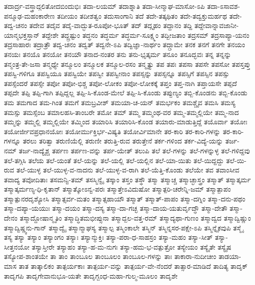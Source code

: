 {ತದಾರ್ದ್ರ-ವಸ್ತ್ರಾದ್ಗಲಿತೋದಬಿಂದುಭಿಃ
ತದಾ-ಲಯಮ್
ತದಾಶ್ನಾತಿ
ತದಾ-ಸೀನ್ಮಾಘ-ಮಾಸೋ-ಽಪಿ
ತದಾ-ಽಸಾವಶ-ಪನ್ಮೂಢ-ಮಹಂಕಾರೇಣ
ತದೀಯಂ
ತದೀಶತ್ವಂ
ತದುಸಾಂಗಾನಿ
ತದೆ
ತದೇ-ತತ್ಕಥಿತಂ
ತದೇ-ತದ್ವಕ್ತುಮರ್ಹಥ
ತದೇ-ತದ್ವ-ಚನಂ
ತದೇವ
ತದೈವ
ತದೈ-ವಾದ್ಭುತ-ರೂಪೋ-ಭೂತ್
ತದ್
ತದ್ಗೃಹಂ
ತದ್ದಾನಂ
ತದ್ದಿ
ತದ್ದೇವಾನ್ನಾವಜಾನೀ-ಯಾನ್ಮಭಕ್ತಸ್ತಾನ್
ತದ್ದೇಶೇ
ತದ್ದ್ರಷ್ಟುಂ
ತದ್ಧನಂ
ತದ್ಧರ್ಮ
ತದ್ಧರ್ಮ-ಸೂಕ್ಷ್ಮಂ
ತದ್ಬೀಜತಾಂ
ತದ್ರಸಮ್
ತದ್ರಸಾಪ್ಯಾ-ಯನಂ
ತದ್ರಸಾಹಾರಃ
ತದ್ರಾತ್ರೌ
ತದ್ವ-ಚನಂ
ತದ್ವತ್
ತದ್ವನೇ-ಽಪಿ
ತದ್ವಿಜ್ಞಾ-ನಾರ್ಥಂ
ತದ್ಗ್ರಾಮೇ
ತನಕ
ತನಗೆ
ತನಗೇ
ತನಯಂ
ತನಯಃ
ತನಯೊ
ತನಯೋ
ತನಯೌ
ತನಾದ-ನಂತರ
ತನು
ತನು-ಭೃತ್ಕರ್ಮ
ತನೂಂ
ತನೂದ್ಭವಃ
ತನ್ನ
ತನ್ನನ್ನು
ತನ್ಮಂತ್ರ-ತೇ-ಜಸಾ
ತನ್ಮಧ್ಯೇ
ತನ್ಮೂಲಂ
ತನ್ಮೂಲಕ
ತನ್ಮೂಲ-ರಸಂ
ತನ್ಮೃತ್ಯು
ತಪ
ತಪಃ
ತಪಸಾ
ತಪಸೇ
ತಪಸೋ
ತಪಸ್ತಪ್ತು
ತಪಸ್ವಿ-ಗಳಿಗೂ
ತಪಸ್ವಿಯೂ
ತಪಸ್ವಿಯೇ
ತಪಸ್ವೀ
ತಪಸ್ವೀನಾಂ
ತಪಸ್ಸನ್ನು
ತಪಸ್ಸನ್ನೂ
ತಪಸ್ಸಿಗೆ
ತಪಸ್ಸಿನ
ತಪಸ್ಸು
ತಪಸ್ಸೆಂದರೆ
ತಪಸ್ಸೇ
ತಪೋ
ತಪೋ-ಭಿಶ್ಚ
ತಪೋ-ಲೋಕಂ
ತಪೋ-ಲೋಕಕ್ಕೆ
ತಪ್ತಂ
ತಪ್ತ-ನಾಗಿ
ತಪ್ತಾಯಸೇ
ತಪ್ಪದೆ
ತಪ್ಪದೇ
ತಪ್ಪಿ
ತಪ್ಪಿ-ಗಾಗಿ
ತಪ್ಪಿದ್ದಲ್ಲ
ತಪ್ಪಿ-ಸಿ-ಕೊಂಡ-ಮೇಲೆ
ತಪ್ಪಿ-ಸಿ-ಕೊಂಡು
ತಪ್ಪುಣ್ಯಂ
ತಬ್ಬಿ-ಕೊಂಡನು
ತಬ್ಬಿ-ಕೊಂಡು
ತಮ
ತಮಗಾದ
ತಮ-ಗಿಂತ
ತಮಗೆ
ತಮಬ್ರವೀಶ್
ತಮಯಾ-ಚ-ಯನ್
ತಮರ್ಭಕಂ
ತಮಶ್ಚೈವ
ತಮಸಿ
ತಮಸ್ಯ
ತಮಸ್ಸು
ತಮಸ್ಸೆಂಬ
ತಮಾಲಹಸಿ-ತಾಂಬರೇ
ತಮೋ
ತಮ್
ತಮ್ಮ
ತಮ್ಮಂಥ-ವರ
ತಮ್ಮ-ತಮ್ಮಲ್ಲಿಯೇ
ತಮ್ಮ-ನಾದ
ತಮ್ಮನ್ನು
ತಮ್ಮಲ್ಲಿ
ತಮ್ಮಲ್ಲಿಯೇ
ತಮ್ಮಿಂದ
ತಯಾರಿಸಿ
ತಯಾರಿಸಿ-ಕೊಂಡ
ತಯಾರು-ಮಾಡುತ್ತಿದ್ದೆ
ತಯೊರ್ವಾ
ತಯೋಃ
ತಯೋರ್ಜೀವಪ್ರಧಾನಯೋಃ
ತಯೋರ್ಮುಕ್ತಿರ್ಭ-ವಿಷ್ಯತಿ
ತಯೋರ್ವಿಮಾನೇ
ತರ-ಕಾರಿ
ತರ-ಕಾರಿ-ಗಳನ್ನು
ತರ-ಕಾರಿ-ಗಳನ್ನೂ
ತರಲು
ತರಿತ್ವಾ
ತರುಣಿಯೆಲ್ಲಿ
ತರುಣೀ
ತರುತ್ತಿ-ರುವ
ತರುತ್ತೇನೆ
ತರ್ಕ-ಗಳಿಂದ
ತರ್ಕ-ವಿದ್ಯೆ-ಯನ್ನು
ತರ್ಜ-ನಮ್
ತರ್ಜ-ನಾದ್ಯೈಶ್ಚ
ತರ್ಪಣ
ತರ್ಪಣ-ವನ್ನು
ತರ್ಪ-ಯೇತ್
ತಲುಪಿ
ತಲೆ
ತಲೆ-ಗಳನ್ನು
ತಲೆ-ಗಳನ್ನುಳ್ಳ
ತಲೆ-ಗಳಿದ್ದವು
ತಲೆ-ತಗ್ಗಿಸಿ
ತಲೆಯ
ತಲೆ-ಯಂತೆ
ತಲೆ-ಯನ್ನು
ತಲೆ-ಯಲ್ಲಿ
ತಲೆ-ಯಲ್ಲಿನ
ತಲೆ-ಯಾ-ಯಿತು
ತಲೆ-ಯಿದ್ದದ್ದು
ತಲೆ-ಯಿ-ರುವ
ತಲೆ-ಯುಳ್ಳ
ತಲೆ-ಯುಳ್ಳ-ವ-ನಾದನು
ತಲೆ-ಯುಳ್ಳ-ವ-ರಾಗಿ
ತಲೆ-ಯೆತ್ತಿ-ಕೊಂಡು
ತಲೆಯೇ
ತವ
ತವಾಂಸೀವ
ತವಾದ್ಯ
ತವೋದಿತಾಃ
ತಸಮನ್ವಿ-ತಮ್
ತಸಸ್ಮಿನ್ವೈ
ತಸ್ಕಾಂ
ತಸ್ತಂ
ತಸ್ಥೌ
ತಸ್ಮಾ
ತಸ್ಮಾಚ್ಚ
ತಸ್ಮಾಚ್ಛಾಸ್ತ್ರಂ
ತಸ್ಮಾತ್
ತಸ್ಮಾತ್ಕರ್ಮ
ತಸ್ಮಾತ್ಕರ್ಮಣ್ಯ-ಧಿ-ಕೃತಾನ್
ತಸ್ಮಾತ್ಕೋಽನ್ವ-ಪರಃ
ತಸ್ಮಾತ್ತೇಽವಿದುಷೋ
ತಸ್ಮಾತ್ಪರಿ-ಚರೇನ್ನಿ-ಜಮ್
ತಸ್ಮಾತ್ಪಾಪಂ
ತಸ್ಮಾತ್ಪುನರದೃಶ್ಯೋಸಿ
ತಸ್ಮಾತ್ಸರ್ವ-ಮತಂ
ತಸ್ಮಾತ್ಸಹಾಯೌ
ತಸ್ಮಾತ್
ತಸ್ಮಾತ್-ಪಾಪಂ
ತಸ್ಮಾ-ದಗ್ನಿಂ
ತಸ್ಮಾ-ದನು-ಪಥಂ
ತಸ್ಮಾ-ದಪ್ಯಾ-ಯಯುಃ
ತಸ್ಮಾ-ದಯಂ
ತಸ್ಮಾ-ದಸ್ಯ
ತಸ್ಮಾ-ದಾ-ಗಚ್ಛ
ತಸ್ಮಾ-ದಾಯ-ಯತುರ್ವೃದ್ಧೌ
ತಸ್ಮಾ-ದೇತೌ
ತಸ್ಮಾ-ದೇನಂ
ತಸ್ಮಾದ್ದೋಷಾನ್ಮೃತಿಂ
ತಸ್ಮಾದ್ಧಿತಮಭೀಪ್ಸುನಾ
ತಸ್ಮಾದ್ಬಲ-ವತ್ತ-ರಮ್
ತಸ್ಮಾದ್ಯಥಾ-ಗುಣಂ
ತಸ್ಮಾದ್ವದ
ತಸ್ಮಾದ್ವಿಷ್ಣುಂ
ತಸ್ಮಾದ್ವಿಷ್ಣ್ವನು-ಗಾನ್
ತಸ್ಮಾದ್ವೈ
ತಸ್ಮಾನ್ಮಾಘಸ್ಯ
ತಸ್ಮಾಲ್ಪ
ತಸ್ಮಿಂಕಾಲೇ
ತಸ್ಮಿನ್
ತಸ್ಮಿನ್ನಸರ-ಪಕ್ಷೇ-ಽಪಿ
ತಸ್ಮಿನ್ನೈಕವುಪಿ
ತಸ್ಮೈ
ತಸ್ಯ
ತಸ್ಯಾ
ತಸ್ಯಾಂ
ತಸ್ಯಾಂಗಂ
ತಸ್ಯಾಃ
ತಸ್ಯಾನ್ಮುಕ್ತಿಃ
ತಸ್ಯಾ-ಪರಾ-ಧ-ಸಾಹಸ್ರಂ
ತಸ್ಯಾ-ಮಹಂ
ತಸ್ಯಾ-ಸೀತ್
ತಸ್ಯಾ-ಸೀತ್ತನಯೋ
ತಸ್ಯಾಸ್ತೀರೇ
ತಸ್ಯಾಹಂ
ತಸ್ಯಾ-ಹ-ಮ-ನುಗಃ
ತಸ್ಯಾ-ಹಮ-ಭ-ವತ್ಪುತ್ರೋ
ತಸ್ಯೇಯಂ
ತಸ್ಯೈತೇ
ತಸ್ಯೈಷ
ತಸ್ಯೋಪ-ಶಾಂತಯೇ
ತಾ
ತಾಂ
ತಾಂಬೂಲ
ತಾಂಬೂಲಂ
ತಾಂಬೂಲ-ಗಳನ್ನು
ತಾಃ
ತಾಕಾರಾ-ನುದೀಚೀಂ
ತಾಡಯಾ-ಮಾಸ
ತಾತ
ತಾತ್ಕಾಲಿಕಂ
ತಾತ್ಪರ್ಯಕಾಃ
ತಾತ್ಪರ್ಯ-ವನ್ನು
ತಾತ್ಪರ್ಯ-ವೇ-ನೆಂದರೆ
ತಾತ್ಸಾರ-ಮಾಡಿದೆ
ತಾದಿತ್ಯ
ತಾದೃಕ್
ತಾದೃಗಪಿ
ತಾದೃಗೇವಾನುಭೂ-ಯತೇ
ತಾದೃಗ್ಬಂಧ-ಮಹಾ-ಗುಲ್ಮ-ಮೂಲಂ
ತಾದೃಶೇ
}
